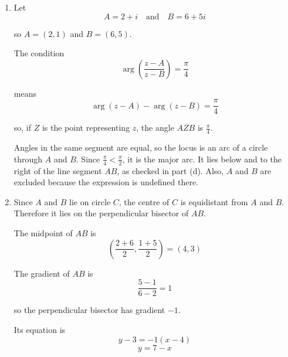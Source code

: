 \documentclass[leqno]{article}
\begin{document}
\begin{enumerate}[
  label=\textbf{\arabic*.},
  leftmargin=*,
  topsep=0pt,
  partopsep=0pt,
  parsep=0pt
]
\vspace*{10pt}

\begin{djsSolution}
\begin{enumerate}[label=\textbf{(\alph*)}]
  \item Let
  \[
  A=2+i\quad\text{and}\quad B=6+5i
  \]

  so \(A=(2,1)\) and \(B=(6,5)\).

  The condition
  \[
  \arg\left(\frac{z-A}{z-B}\right)=\frac{\pi}{4}
  \]

  means
  \[
  \arg(z-A)-\arg(z-B)=\frac{\pi}{4}
  \]

  so, if \(Z\) is the point representing \(z\), the angle \(AZB\) is \(\frac{\pi}{4}\).

  Angles in the same segment are equal, so the locus is an arc of a circle through \(A\) and \(B\). Since \(\frac{\pi}{4}<\frac{\pi}{2}\), it is the major arc. It lies below and to the right of the line segment \(AB\), as checked in part (d). Also, \(A\) and \(B\) are excluded because the expression is undefined there.

  \begin{center}
  \end{center}

  \item Since \(A\) and \(B\) lie on circle \(C\), the centre of \(C\) is equidistant from \(A\) and \(B\). Therefore it lies on the perpendicular bisector of \(AB\).

  The midpoint of \(AB\) is
  \[
  \left(\frac{2+6}{2},\frac{1+5}{2}\right)=(4,3)
  \]

  The gradient of \(AB\) is
  \[
  \frac{5-1}{6-2}=1
  \]

  so the perpendicular bisector has gradient \(-1\).

  Its equation is
  \[
  y-3=-1(x-4)
  \]
  \[
  y=7-x
  \]


\end{enumerate}
\end{djsSolution}
\end{enumerate}
\end{document}
